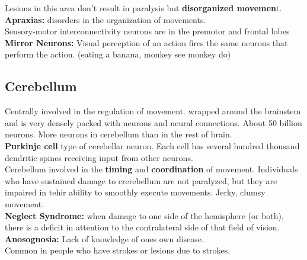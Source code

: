 \documentclass{article}
\begin{document}
\noindent Lesions in this area don't result in paralysis but \textbf{disorganized movemen}t. \\
\textbf{Apraxias:} disorders in the organization of movements. \\

\noindent Sensory-motor interconnectivity neurons are in the premotor and frontal lobes \\

\noindent \textbf{Mirror Neurons:} Visual perception of an action fires the same neurons that perform the action. (eating a banana, monkey see monkey do) \\

\subsection{Cerebellum}
Centrally involved in the regulation of movement. wrapped around the brainstem and is very densely packed with neurons and neural connections. About 50 billion neurons. More neurons in cerebellum than in the rest of brain. \\

\textbf{Purkinje cell} type of cerebellar neuron. Each cell has several hundred thousand dendritic spines receiving input from other neurons. \\

Cerebellum involved in the \textbf{timing} and \textbf{coordination} of movement. Individuals who have sustained damage to crerebellum are not paralyzed, but they are impaired in tehir ability to smoothly execute movements. Jerky, clumsy movement. \\

\noindent \textbf{Neglect Syndrome:} when damage to one side of the hemisphere (or both), there is a deficit in attention to the contralateral side of that field of vision. \\

\noindent \textbf{Anosognosia:} Lack of knowledge of ones own disease. \\ 
Common in people who have strokes or lesions due to strokes. \\
\end{document}
